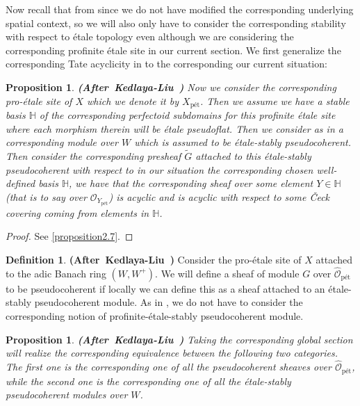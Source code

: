 \documentclass[12pt]{amsart}
\newtheorem{proposition}[theorem]{Proposition}
\theoremstyle{definition}
\newtheorem{definition}[theorem]{Definition}
\numberwithin{equation}{section}
\begin{document}
\indent Now recall that from \cite{KL2} since we do not have modified the corresponding underlying spatial context, so we will also only have to consider the corresponding stability with respect to \'etale topology even although we are considering the corresponding profinite \'etale site in our current section. We first generalize the corresponding Tate acyclicity in \cite{KL2} to the corresponding our current situation:


\begin{proposition}\mbox{\bf{(After Kedlaya-Liu \cite[Theorem 3.4.6]{KL2})}} 
Now we consider the corresponding pro-\'etale site of $X$ which we denote it by $X_\text{p\'et}$. Then we assume we have a stable basis $\mathbb{H}$ of the corresponding perfectoid subdomains for this profinite \'etale site where each morphism therein will be \'etale pseudoflat. Then we consider as in \cite[Theorem 3.4.6]{KL2} a corresponding module over $W$ which is assumed to be \'etale-stably pseudocoherent. Then consider the corresponding presheaf $\widetilde{G}$ attached to this \'etale-stably pseudocoherent with respect to in our situation the corresponding chosen well-defined basis $\mathbb{H}$, we have that the corresponding sheaf over some element $Y\in \mathbb{H}$ (that is to say over $\mathcal{O}_{Y_\text{p\'et}}$) is acyclic and is acyclic with respect to some \v{C}eck covering coming from elements in $\mathbb{H}$. 
\end{proposition}


\begin{proof}
See \cref{proposition2.7}.
\end{proof}




\begin{definition}\mbox{\bf{(After Kedlaya-Liu \cite[Definition 3.4.7]{KL2})}} 
Consider the pro-\'etale site of $X$ attached to the adic Banach ring $(W,W^+)$. We will define a sheaf of module $G$ over $\widehat{\mathcal{O}}_\text{p\'et}$ to be pseudocoherent if locally we can define this as a sheaf attached to an \'etale-stably pseudocoherent module. As in \cite[Definition 3.4.7]{KL2}, we do not have to consider the corresponding notion of profinite-\'etale-stably pseudocoherent module.	
\end{definition}




\begin{proposition}\mbox{\bf{(After Kedlaya-Liu \cite[Theorem 3.4.8]{KL2})}}
Taking the corresponding global section will realize the corresponding equivalence between the following two categories. The first one is the corresponding one of all the pseudocoherent sheaves over $\widehat{\mathcal{O}}_\text{p\'et}$, while the second one is the corresponding one of all the \'etale-stably pseudocoherent modules over $W$.
	
\end{proposition}
\end{document}

